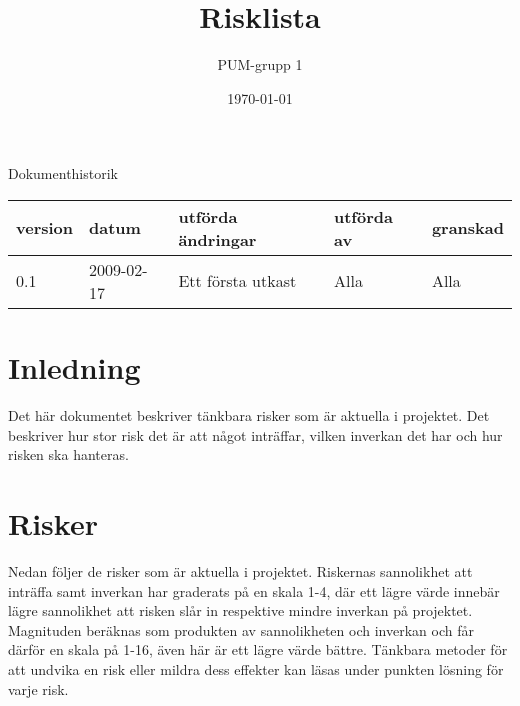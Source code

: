 

\ifpdf
\else
\fi

\title{Risklista}
\author{PUM-grupp 1}
\date{\today}



\maketitle\thispagestyle{empty}

\newpage

{\centering \Large{Dokumenthistorik\\}}

\vspace{10pt}
\begin{tabularx}{\textwidth}{ |l|l|X|l|l| }
  \hline
    \textbf{version} & \textbf{datum} & \textbf{utförda ändringar} & \textbf{utförda av} & \textbf{granskad} \\
	\hline 0.1 & 2009-02-17 & Ett första utkast & Alla & Alla \\
  \hline
\end{tabularx}

\newpage

\setcounter{tocdepth}{2}
\tableofcontents
\newpage

\setcounter{tocdepth}{2}
\newpage

\section{Inledning}
Det här dokumentet beskriver tänkbara risker som är aktuella i projektet. Det beskriver hur stor risk det är att något inträffar, vilken inverkan det har och hur risken ska hanteras.

\section{Risker}
Nedan följer de risker som är aktuella i projektet. Riskernas sannolikhet att inträffa samt inverkan har graderats på en skala 1-4, där ett lägre värde innebär lägre sannolikhet att risken slår in respektive mindre inverkan på projektet. Magnituden beräknas som produkten av sannolikheten och inverkan och får därför en skala på 1-16, även här är ett lägre värde bättre. Tänkbara metoder för att undvika en risk eller mildra dess effekter kan läsas under punkten lösning för varje risk.

